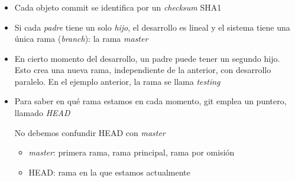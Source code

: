 \documentclass[ucs]{beamer}
\begin{document}
\begin{frame}[fragile]
\frametitle{}
\begin{itemize}
\item
Cada objeto commit se identifica por un \emph{checksum} SHA1
\item
Si cada \emph{padre} tiene un solo \emph{hijo}, el desarrollo es lineal
y el sistema tiene una única rama (\emph{branch}): la rama \emph{master}
\item
En cierto momento del desarrollo, un padre puede tener un segundo hijo. Esto
crea una nueva rama, independiente de la anterior, con desarrollo paralelo. 
En el ejemplo anterior, la rama se llama \emph{testing}
\item
Para saber en qué rama estamos en cada momento, git emplea un puntero, llamado
\emph{HEAD}

No debemos confundir HEAD con \emph{master}
\begin{itemize}
\item
\emph{master}: primera rama, rama principal, rama por omisión
\item
HEAD: rama en la que estamos actualmente
\end{itemize}

\end{itemize}

\end{frame}

\end{document}
